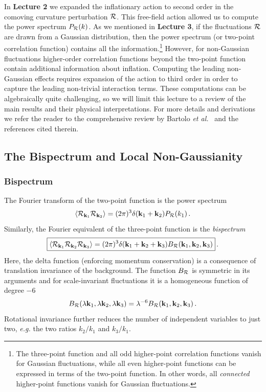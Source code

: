 \documentclass[12pt,letterpaper,rotate]{article}
\def\beq{\begin{equation}}
\def\eeq{\end{equation}}
\def\R{{\cal R}}
\begin{document}
{In {\bf Lecture 2} we expanded the inflationary action to second order in the comoving curvature perturbation $\R$. This free-field action allowed us to compute the power spectrum $P_\R(k)$. As we mentioned in {\bf Lecture 3}, if the fluctuations $\R$ are drawn from a Gaussian distribution, then the power spectrum (or two-point correlation function) contains all the information.\footnote{The three-point function and all odd higher-point correlation functions vanish for Gaussian fluctuations, while all even higher-point functions can be expressed in terms of the two-point function. In other words, all {\it connected} higher-point functions vanish for Gaussian fluctuations.}
However, for non-Gaussian fluctuations higher-order correlation functions beyond the two-point function contain additional
 information about inflation.
 Computing the leading non-Gaussian effects requires expansion of the action to third order in order to capture the leading non-trivial interaction terms.  These computations can be algebraically quite challenging, so we will limit this lecture to a review of the main results and their physical interpretations. For more details and derivations we refer the reader to the comprehensive review by Bartolo {\it et al.}~\cite{NGreview} and the references cited therein.


\subsection{The Bispectrum and Local Non-Gaussianity}

\subsubsection{Bispectrum}

The Fourier transform of the two-point function is the power spectrum
\beq
\langle \R_{{\bf k}_1}  \R_{{\bf k}_2}    \rangle =(2\pi)^3 \delta({\bf k}_1 + {\bf k}_2 ) P_\R(k_1)\, . 
\eeq
Similarly, the Fourier equivalent of the three-point function is the {\it bispectrum}
\beq
\label{equ:bi}
\fbox{$\displaystyle
\langle \R_{{\bf k}_1}  \R_{{\bf k}_2}   \R_{{\bf k}_3} \rangle =(2\pi)^3 \delta({\bf k}_1 + {\bf k}_2 + {\bf k}_3)  B_\R({\bf k}_1,{\bf k}_2, {\bf k}_3) $}\, .
\eeq
Here, the delta function (enforcing momentum conservation) is a consequence of translation invariance of the background.
The function $B_\R$ is symmetric in its arguments and for scale-invariant fluctuations it is a homogeneous function of degree $-6$
\beq
B_\R( \lambda {\bf k}_1, \lambda {\bf k}_2, \lambda {\bf k}_3) = \lambda^{-6} B_\R({\bf k}_1,{\bf k}_2, {\bf k}_3) \, .
\eeq
Rotational invariance further reduces the number of independent variables to just two, {\it e.g.} the two ratios $k_2/k_1$ and $k_3/k_1$. 

}
\end{document}

